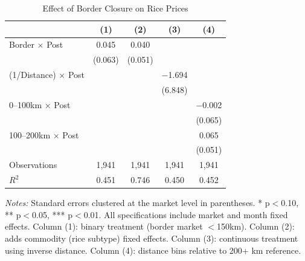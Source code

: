 \begin{table}[H]
\centering
\caption{Effect of Border Closure on Rice Prices}
\label{tab:main}
\begin{threeparttable}
\begin{tabular}{lcccc}
\toprule
& (1) & (2) & (3) & (4) \\
\midrule
Border $\times$ Post & 0.045 & 0.040 & & \\
& (0.063) & (0.051) & & \\
(1/Distance) $\times$ Post & & & $-$1.694 & \\
& & & (6.848) & \\
0--100km $\times$ Post & & & & $-$0.002 \\
& & & & (0.065) \\
100--200km $\times$ Post & & & & 0.065 \\
& & & & (0.051) \\
\midrule
Observations & 1,941 & 1,941 & 1,941 & 1,941 \\
$R^2$ & 0.451 & 0.746 & 0.450 & 0.452 \\
\bottomrule
\end{tabular}
\begin{tablenotes}[flushleft]
\small
\item \emph{Notes:} Standard errors clustered at the market level in parentheses. * p$<$0.10, ** p$<$0.05, *** p$<$0.01. All specifications include market and month fixed effects. Column (1): binary treatment (border market $<$150km). Column (2): adds commodity (rice subtype) fixed effects. Column (3): continuous treatment using inverse distance. Column (4): distance bins relative to 200+ km reference.
\end{tablenotes}
\end{threeparttable}
\end{table}
